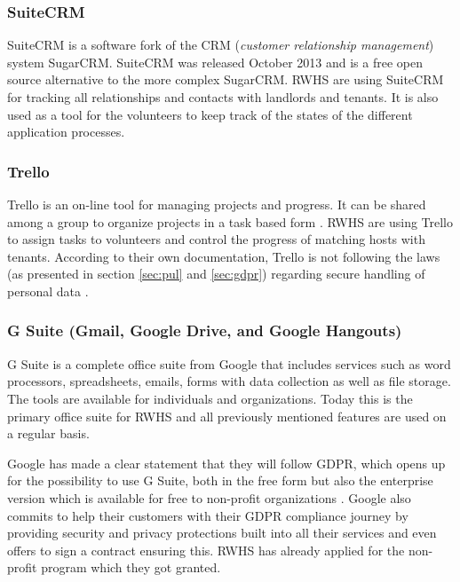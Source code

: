 \subsubsection{SuiteCRM}
SuiteCRM is a software fork of the CRM (\textit{customer relationship management}) system SugarCRM. SuiteCRM was released October 2013 and is a free open source alternative to the more complex SugarCRM. RWHS are using SuiteCRM for tracking all relationships and contacts with landlords and tenants. It is also used as a tool for the volunteers to keep track of the states of the different application processes. \cite{CommunitySuiteCRM2014AboutDocumentation}

\subsubsection{Trello}
\label{sec:background:trello}
Trello is an on-line tool for managing projects and progress. It can be shared among a group to organize projects in a task based form \cite{Trello}. RWHS are using Trello to assign tasks to volunteers and control the progress of matching hosts with tenants. According to their own documentation, Trello is not following the laws (as presented in section \ref{sec:pul} and \ref{sec:gdpr}) regarding secure handling of personal data \cite{Trelloa}. 

\subsubsection{G Suite (Gmail, Google Drive, and Google Hangouts)}
\label{sec:background:g-suite}
G Suite is a complete office suite from Google that includes services such as word processors, spreadsheets, emails, forms with data collection as well as file storage. The tools are available for individuals and organizations. Today this is the primary office suite for RWHS and all previously mentioned features are used on a regular basis. \cite{GoogleAnvandarvillkorSuite}

Google has made a clear statement that they will follow GDPR, which opens up for the possibility to use G Suite, both in the free form but also the enterprise version which is available for free to non-profit organizations \cite{Googlea}. Google also commits to help their customers with their GDPR compliance journey by providing security and privacy protections built into all their services and even offers to sign a contract ensuring this. RWHS has already applied for the non-profit program which they got granted.

